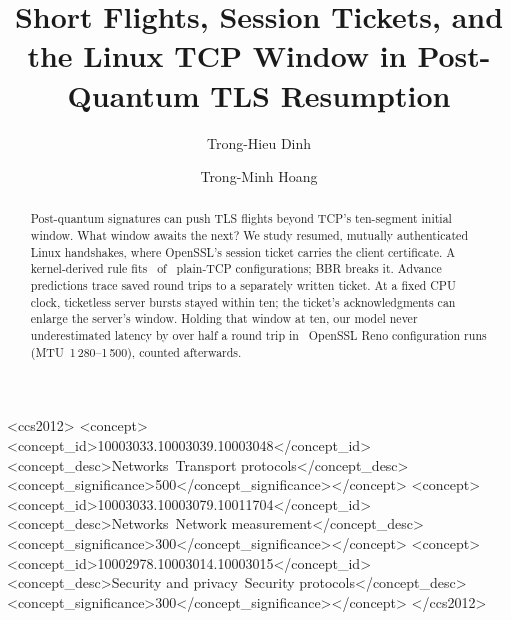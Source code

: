 \documentclass[sigconf,9pt,nonacm]{acmart}
\begin{document}
\title{Short Flights, Session Tickets, and the Linux TCP Window in Post-Quantum TLS Resumption}
\author{Trong-Hieu Dinh}
\author{Trong-Minh Hoang}
\begin{abstract}
Post-quantum signatures can push TLS flights beyond TCP's ten-segment initial window. What window awaits the next? We study resumed, mutually authenticated Linux handshakes, where OpenSSL's session ticket carries the client certificate. A kernel-derived rule fits \NExact\ of \NCfg\ plain-TCP configurations; BBR breaks it. Advance predictions trace saved round trips to a separately written ticket. At a fixed CPU clock, ticketless server bursts stayed within ten; the ticket's acknowledgments can enlarge the server's window. Holding that window at ten, our model never underestimated latency by over half a round trip in \OsRuns\ OpenSSL Reno configuration runs (MTU~1\,280--1\,500), counted afterwards.
\end{abstract}
\begin{CCSXML}
<ccs2012>
<concept><concept_id>10003033.10003039.10003048</concept_id><concept_desc>Networks~Transport protocols</concept_desc><concept_significance>500</concept_significance></concept>
<concept><concept_id>10003033.10003079.10011704</concept_id><concept_desc>Networks~Network measurement</concept_desc><concept_significance>300</concept_significance></concept>
<concept><concept_id>10002978.10003014.10003015</concept_id><concept_desc>Security and privacy~Security protocols</concept_desc><concept_significance>300</concept_significance></concept>
</ccs2012>
\end{CCSXML}
\makeatletter\g@addto@macro\@concepts{\linebreak}\makeatother %
\maketitle
\end{document}
